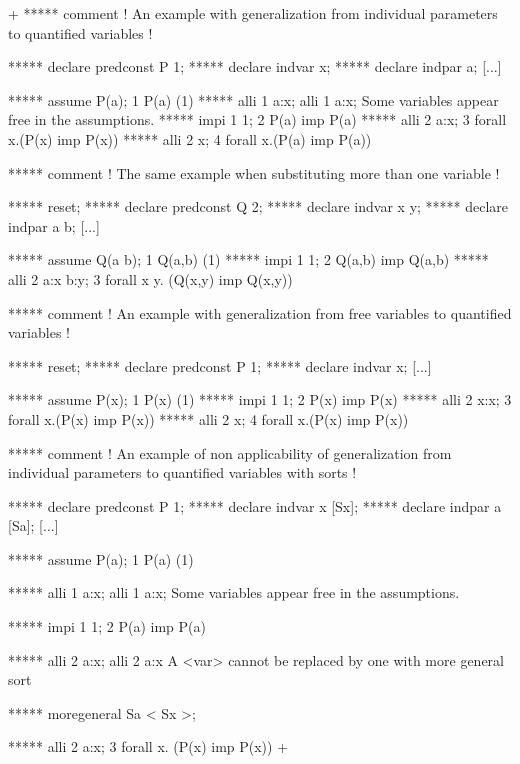 \gfexample+
   ***** comment ! An example with generalization from individual parameters
                   to quantified variables !
        
   ***** declare predconst P 1;
   ***** declare indvar x;
   ***** declare indpar a;
   [...]

   ***** assume P(a);
   1   P(a)     (1)
   ***** alli 1 a:x;
   alli 1 a:x;
   Some variables appear free in the assumptions.
   ***** impi 1 1;
   2   P(a) imp P(a)
   ***** alli 2 a:x;
   3   forall x.(P(x) imp P(x))
   ***** alli 2 x;
   4   forall x.(P(a) imp P(a))
    
     
   ***** comment ! The same example when substituting more than one variable !
     
   ***** reset;
   ***** declare predconst Q 2;
   ***** declare indvar x y;
   ***** declare indpar a b;
   [...]

   ***** assume Q(a b);
   1   Q(a,b)     (1)
   ***** impi 1 1;
   2   Q(a,b) imp Q(a,b)
   ***** alli 2 a:x b:y;
   3   forall x y. (Q(x,y) imp Q(x,y))


   ***** comment ! An example with generalization from free variables
                   to quantified variables !

   ***** reset;
   ***** declare predconst P 1;
   ***** declare indvar x;
   [...]

   ***** assume P(x);
   1   P(x)     (1)
   ***** impi 1 1;
   2   P(x) imp P(x)
   ***** alli 2 x:x;
   3   forall x.(P(x) imp P(x))
   ***** alli 2 x;
   4   forall x.(P(x) imp P(x))
     

   ***** comment ! An example of non applicability of generalization from
                   individual parameters to quantified variables with sorts !
      
   ***** declare predconst P 1;
   ***** declare indvar x [Sx];
   ***** declare indpar a [Sa];
   [...]

   ***** assume P(a);
   1   P(a)     (1)

   ***** alli 1 a:x;
   alli 1 a:x;
   Some variables appear free in the assumptions.

   ***** impi 1 1;
   2   P(a) imp P(a)

   ***** alli 2 a:x;
   alli 2 a:x
   A <var> cannot be replaced by one with more general sort

   ***** moregeneral Sa < Sx >;

   ***** alli 2 a:x;
   3   forall x. (P(x) imp P(x))
+


